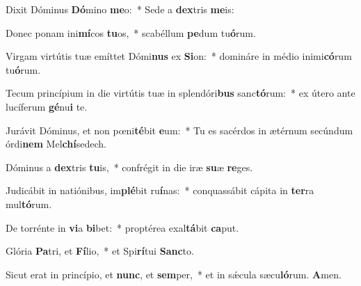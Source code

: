 \item Dixit Dóminus \textbf{Dó}mino \textbf{me}o:~* Sede a \textbf{dex}tris \textbf{me}is:

\item Donec ponam ini\textbf{mí}cos \textbf{tu}os,~* scabéllum \textbf{pe}dum tu\textbf{ó}rum.

\item Virgam virtútis tuæ emíttet Dómi\textbf{nus} ex \textbf{Si}on:~* domináre in médio inimi\textbf{có}rum tu\textbf{ó}rum.

\item Tecum princípium in die virtútis tuæ in splendóri\textbf{bus} sanc\textbf{tó}rum:~* ex útero ante lucíferum \textbf{gé}nu\textbf{i} te.

\item Jurávit Dóminus, et non pœni\textbf{té}bit \textbf{e}um:~* Tu es sacérdos in ætérnum secúndum órdi\textbf{nem} Mel\textbf{chí}sedech.

\item Dóminus a \textbf{dex}tris \textbf{tu}is,~* confrégit in die iræ \textbf{su}æ \textbf{re}ges.

\item Judicábit in natiónibus, im\textbf{plé}bit ru\textbf{í}nas:~* conquassábit cápita in \textbf{ter}ra mul\textbf{tó}rum.

\item De torrénte in \textbf{vi}a \textbf{bi}bet:~* proptérea exal\textbf{tá}bit \textbf{ca}put.

\item Glória \textbf{Pa}tri, et \textbf{Fí}lio,~* et Spi\textbf{rí}tui \textbf{Sanc}to.

\item Sicut erat in princípio, et \textbf{nunc}, et \textbf{sem}per,~* et in sǽcula sæcu\textbf{ló}rum. \textbf{A}men.
